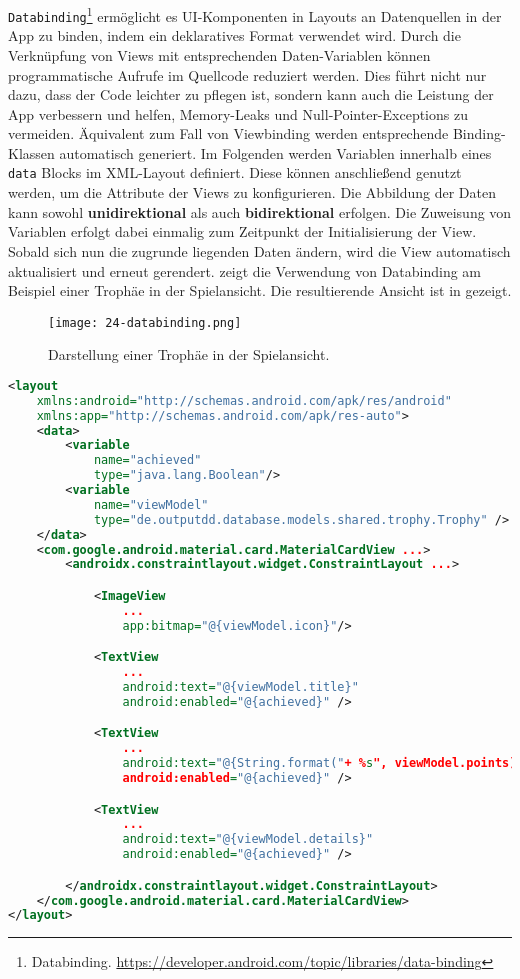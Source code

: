 \texttt{Databinding}\footnote{Databinding. \url{https://developer.android.com/topic/libraries/data-binding}} ermöglicht es UI-Komponenten in Layouts an Datenquellen in der App zu binden, indem ein deklaratives Format verwendet wird. Durch die Verknüpfung von Views mit entsprechenden Daten-Variablen können programmatische Aufrufe im Quellcode reduziert werden. Dies führt nicht nur dazu, dass der Code leichter zu pflegen ist, sondern kann auch die Leistung der App verbessern und helfen, Memory-Leaks und Null-Pointer-Exceptions zu vermeiden. Äquivalent zum Fall von Viewbinding werden entsprechende Binding-Klassen automatisch generiert. Im Folgenden werden Variablen innerhalb eines \texttt{data} Blocks im XML-Layout definiert. Diese können anschließend genutzt werden, um die Attribute der Views zu konfigurieren. Die Abbildung der Daten kann sowohl \textbf{unidirektional} als auch \textbf{bidirektional} erfolgen. Die Zuweisung von Variablen erfolgt dabei einmalig zum Zeitpunkt der Initialisierung der View. Sobald sich nun die zugrunde liegenden Daten ändern, wird die View automatisch aktualisiert und erneut gerendert.  zeigt die Verwendung von Databinding am Beispiel einer Trophäe in der Spielansicht. Die resultierende Ansicht ist in  gezeigt.

\begin{figure}[H]
    \texttt{[image: 24-databinding.png]}
    \caption{Darstellung einer Trophäe in der Spielansicht.}\label{fig:databinding}
\end{figure}

\begin{lstlisting}[language=XML, caption={Databinding am Beispiel einer Trophäe in der Spielansicht.}, label={lst:databinding}]
<layout 
    xmlns:android="http://schemas.android.com/apk/res/android"
    xmlns:app="http://schemas.android.com/apk/res-auto">
    <data>
        <variable
            name="achieved"
            type="java.lang.Boolean"/>
        <variable
            name="viewModel"
            type="de.outputdd.database.models.shared.trophy.Trophy" />
    </data>
    <com.google.android.material.card.MaterialCardView ...>
        <androidx.constraintlayout.widget.ConstraintLayout ...>

            <ImageView 
                ... 
                app:bitmap="@{viewModel.icon}"/>

            <TextView
                ...
                android:text="@{viewModel.title}"
                android:enabled="@{achieved}" />

            <TextView
                ...
                android:text="@{String.format("+ %s", viewModel.points)}"
                android:enabled="@{achieved}" />

            <TextView
                ...
                android:text="@{viewModel.details}"
                android:enabled="@{achieved}" />

        </androidx.constraintlayout.widget.ConstraintLayout>
    </com.google.android.material.card.MaterialCardView>
</layout>
\end{lstlisting}

